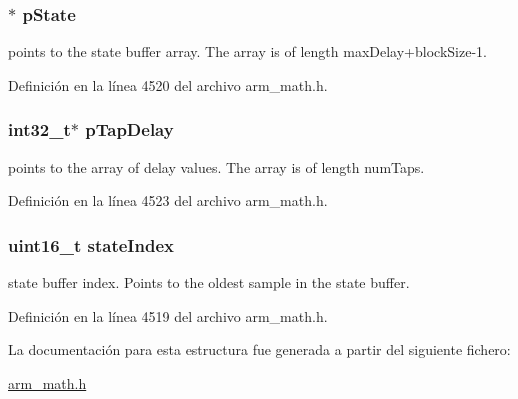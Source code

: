 \subsubsection[{\texorpdfstring{p\+State}{pState}}]{$\ast$ p\+State}\hypertarget{structarm__fir__sparse__instance__q15_ae29dfdb736374fcddaeaec4b7770170c}{}\label{structarm__fir__sparse__instance__q15_ae29dfdb736374fcddaeaec4b7770170c}
points to the state buffer array. The array is of length max\+Delay+block\+Size-\/1. 

Definición en la línea 4520 del archivo arm\+\_\+math.\+h.

\subsubsection[{\texorpdfstring{p\+Tap\+Delay}{pTapDelay}}]{\setlength{\rightskip}{0pt plus 5cm}int32\+\_\+t$\ast$ p\+Tap\+Delay}\hypertarget{structarm__fir__sparse__instance__q15_adec00b3793ab4f08edfeb4ea6a9eb6e6}{}\label{structarm__fir__sparse__instance__q15_adec00b3793ab4f08edfeb4ea6a9eb6e6}
points to the array of delay values. The array is of length num\+Taps. 

Definición en la línea 4523 del archivo arm\+\_\+math.\+h.

\subsubsection[{\texorpdfstring{state\+Index}{stateIndex}}]{\setlength{\rightskip}{0pt plus 5cm}uint16\+\_\+t state\+Index}\hypertarget{structarm__fir__sparse__instance__q15_a566a0cb53437e48b9a3bf18e5b03d8aa}{}\label{structarm__fir__sparse__instance__q15_a566a0cb53437e48b9a3bf18e5b03d8aa}
state buffer index. Points to the oldest sample in the state buffer. 

Definición en la línea 4519 del archivo arm\+\_\+math.\+h.



La documentación para esta estructura fue generada a partir del siguiente fichero\+:\begin{DoxyCompactItemize}
\item 
\hyperlink{arm__math_8h}{arm\+\_\+math.\+h}\end{DoxyCompactItemize}
